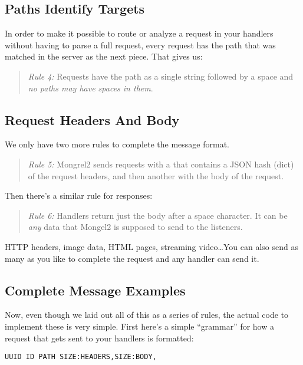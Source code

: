 \subsection{Paths Identify Targets}

In order to make it possible to route or analyze a request in your handlers
without having to parse a full request, every request has the path that
was matched in the server as the next piece.  That gives us:

\begin{quote}
\emph{Rule 4:} Requests have the path as a single string followed by a
    space and \emph{no paths may have spaces in them}.
\end{quote}


\subsection{Request Headers And Body}

We only have two more rules to complete the message format.

\begin{quote}
\emph{Rule 5:} Mongrel2 sends requests with a  that contains a
JSON hash (dict) of the request headers, and then another 
with the body of the request.
\end{quote}

Then there's a similar rule for responses:

\begin{quote}
\emph{Rule 6:} Handlers return just the body after a space character.  It can be \emph{any}
    data that Mongel2 is supposed to send to the listeners.
\end{quote}

HTTP headers, image data, HTML pages, streaming video\ldots You can also send as
many as you like to complete the request and any handler can send it.


\subsection{Complete Message Examples}

Now, even though we laid out all of this as a series of rules, the actual code to implement
these is very simple.  First here's a simple ``grammar'' for how a request that
gets sent to your handlers is formatted:

\begin{Verbatim}
UUID ID PATH SIZE:HEADERS,SIZE:BODY,
\end{Verbatim}

